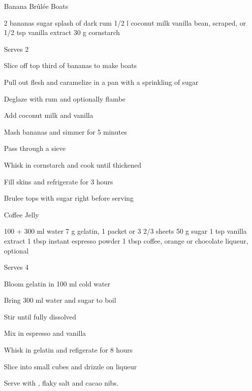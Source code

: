 \begin{denserecipe}{Banana Brûlée Boats}{\vegetarian{}}
\begin{ingredients}
2 bananas
sugar
splash of dark rum
1/2 l coconut milk
vanilla bean, scraped, or 1/2 tsp vanilla extract
30 g cornstarch
\end{ingredients}
\nextcolumn
Serves 2
\begin{steps}
    \item Slice off top third of bananas to make boats
    \item Pull out flesh and caramelize in a pan with a sprinkling of sugar
    \item Deglaze with rum and optionally flambe
    \item Add coconut milk and vanilla
    \item Mash bananas and simmer for 5 minutes
    \item Pass through a sieve
    \item Whisk in cornstarch and cook until thickened
    \item Fill skins and refrigerate for 3 hours
    \item Brulee tops with sugar right before serving
\end{steps}
\end{denserecipe}

\begin{recipe}{Coffee Jelly}{}
\begin{ingredients}
100 + 300 ml water
7 g gelatin, 1 packet or 3 2/3 sheets
50 g sugar
1 tsp vanilla extract
1 tbsp instant \ibreak{}espresso powder
1 tbsp coffee, orange or chocolate liqueur, optional
\end{ingredients}
\nextcolumn
Serves 4
\begin{steps}
    \item Bloom gelatin in 100 ml cold water
    \item Bring 300 ml water and sugar to boil
    \item Stir until fully dissolved
    \item Mix in espresso and vanilla
    \item Whisk in gelatin and refigerate for 8 hours
    \item Slice into small cubes and drizzle on liqueur
\end{steps}
Serve with , flaky salt and cacao nibs.
\end{recipe}

